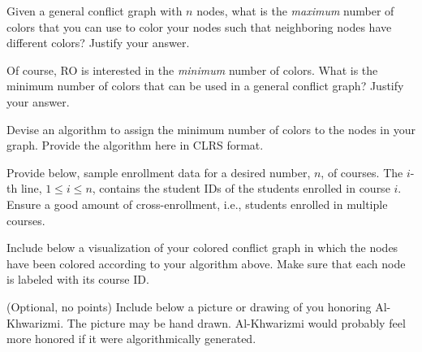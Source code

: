 \documentclass[a4paper]{exam}
\begin{document}
\begin{questions}

\question
  Given a general conflict graph with $n$ nodes, what is the \textit{maximum} number of colors that you can use to color your nodes such that neighboring nodes have different colors? Justify your answer.
  \begin{solution}
    
  \end{solution}
\question
  Of course, RO is interested in the \textit{minimum} number of colors. What is the minimum number of colors that can be used in a general conflict graph? Justify your answer.
  \begin{solution}
    
  \end{solution}

\question
  Devise an algorithm to assign the minimum number of colors to the nodes in your graph. Provide the algorithm here in CLRS format.
  \begin{solution}
    
  \end{solution}

\question
  Provide below, sample enrollment data for a desired number, $n$, of courses. The $i$-th line, $1\le i\le n$, contains the student IDs of the students enrolled in course $i$. Ensure a good amount of cross-enrollment, i.e., students enrolled in multiple courses.
  \begin{solution}
    
  \end{solution}

\question
  Include below a visualization of your colored conflict graph in which the nodes have been colored according to your algorithm above. Make sure that each node is labeled with its course ID.
  \begin{solution}
    
  \end{solution}

  \bonusquestion (Optional, no points)
  Include below a picture or drawing of you honoring Al-Khwarizmi. The picture may be hand drawn. Al-Khwarizmi would probably feel more honored if it were algorithmically generated.
  \begin{solution}
    
  \end{solution}  
\end{questions}
\end{document}
